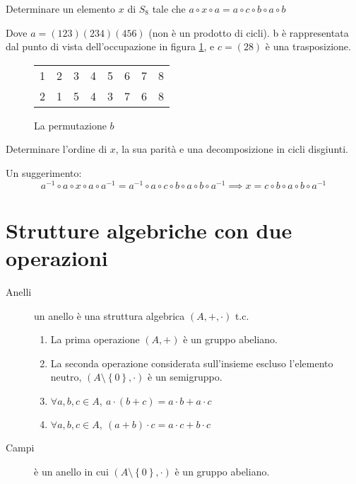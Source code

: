 \begin{esercizio}
Determinare un elemento $x$ di $S_8$ tale che $a \circ x \circ a = a \circ c \circ b \circ a \circ b$

Dove $a = (1 2 3) (2 3 4) (4 5 6)$ (non \`e un prodotto di cicli). b \`e rappresentata dal punto di vista dell'occupazione in figura \ref{fig:esercizio_b}, e $c = (2 8)$ \`e una trasposizione.

\begin{figure}[ht]
\centering
\begin{tabular}{*{8}{c}}
1 & 2 & 3 & 4 & 5 & 6 & 7 & 8 \\
2 & 1 & 5 & 4 & 3 & 7 & 6 & 8
\end{tabular}
\caption{\label{fig:esercizio_b}La permutazione $b$}
\end{figure}

Determinare l'ordine di $x$, la sua parit\`a e una decomposizione in cicli disgiunti.

Un suggerimento:
\[
a^{-1} \circ a \circ x \circ a \circ a^{-1} = a^{-1} \circ a \circ c \circ b \circ a \circ b \circ a^{-1} \implies x = c \circ b \circ a \circ b \circ a^{-1}
\]

\vskip 5cm
\end{esercizio}

\section{Strutture algebriche con due operazioni}

\begin{description}
    \item[Anelli] un anello \`e una struttura algebrica $(A, +, \cdot)$ t.c. 
    \begin{enumerate}
        \item La prima operazione $\left( A, + \right)$ \`e un gruppo abeliano.
        \item La seconda operazione considerata sull'insieme escluso l'elemento neutro, $(A \setminus \left \{ 0 \right \}, \cdot )$ \`e un semigruppo.
        \item $ \forall a, b, c \in A , \ a \cdot (b + c) = a \cdot b + a \cdot c $
        \item $ \forall a, b, c \in A , \ (a + b) \cdot c = a \cdot c + b \cdot c $
    \end{enumerate}
    \item[Campi] \`e un anello in cui $( A \setminus \left \{ 0 \right \}, \cdot )$ \`e un gruppo abeliano.
\end{description}

